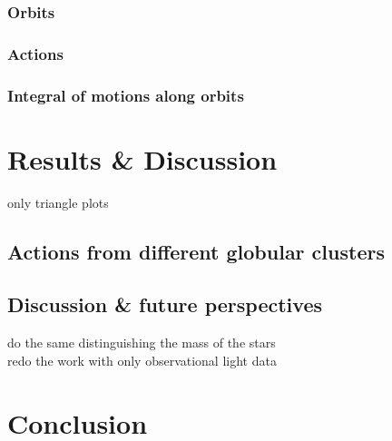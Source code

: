\documentclass[a4paper,12pt,abstracton]{scrartcl}
\begin{document}
\subsubsection{Orbits}
\subsubsection{Actions}
\subsubsection{Integral of motions along orbits}

\section{Results \& Discussion}
only triangle plots

\subsection{Actions from different globular clusters}
\subsection{Discussion \& future perspectives}
do the same distinguishing the mass of the stars\\
redo the work with only observational light data
\newpage
\section{Conclusion}
\end{document}
